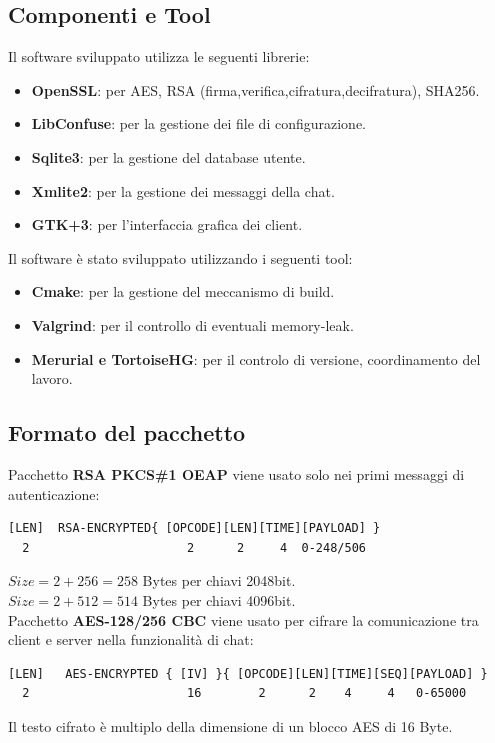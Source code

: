\documentclass[a4paper,titlepage]{article}
\begin{document}
\subsection{Componenti e Tool}
Il software sviluppato utilizza le seguenti librerie:
\begin{itemize}
\item \textbf{OpenSSL}: per AES, RSA (firma,verifica,cifratura,decifratura), SHA256.
\item \textbf{LibConfuse}: per la gestione dei file di configurazione.
\item \textbf{Sqlite3}: per la gestione del database utente.
\item \textbf{Xmlite2}: per la gestione dei messaggi della chat.
\item \textbf{GTK+3}: per l'interfaccia grafica dei client.
\end{itemize}

Il software è stato sviluppato utilizzando i seguenti tool:
\begin{itemize}
\item \textbf{Cmake}: per la gestione del meccanismo di build.
\item \textbf{Valgrind}: per il controllo di eventuali memory-leak.
\item \textbf{Merurial e TortoiseHG}: per il controlo di versione, coordinamento del lavoro.
\end{itemize}
\subsection{Formato del pacchetto}

Pacchetto \textbf{RSA PKCS\#1 OEAP} viene usato solo nei primi messaggi di autenticazione:
{\color{red} \begin{verbatim}
[LEN]  RSA-ENCRYPTED{ [OPCODE][LEN][TIME][PAYLOAD] }
  2                      2      2     4  0-248/506
\end{verbatim}}
$Size = 2 + 256= 258$ Bytes per chiavi 2048bit.\\
$Size = 2 + 512= 514$ Bytes per chiavi 4096bit.\\

Pacchetto \textbf{AES-128/256 CBC} viene usato per cifrare la comunicazione tra client e server nella funzionalità di chat:
{\color{red} \begin{verbatim}
[LEN]   AES-ENCRYPTED { [IV] }{ [OPCODE][LEN][TIME][SEQ][PAYLOAD] }
  2                      16        2      2    4     4   0-65000
\end{verbatim} }
Il testo cifrato è multiplo della dimensione di un blocco AES di 16 Byte.
\end{document}

